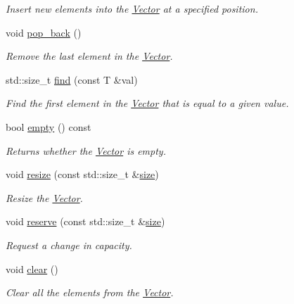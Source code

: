 \begin{DoxyCompactItemize}
\begin{DoxyCompactList}\small\item\em Insert new elements into the \hyperlink{classLuna_1_1Vector}{Vector} at a specified position. \end{DoxyCompactList}\item 
void \hyperlink{classLuna_1_1Vector_afd5c648a6a46b09e75ba94f8e7bc65ba}{pop\+\_\+back} ()
\begin{DoxyCompactList}\small\item\em Remove the last element in the \hyperlink{classLuna_1_1Vector}{Vector}. \end{DoxyCompactList}\item 
std\+::size\+\_\+t \hyperlink{classLuna_1_1Vector_a3400289dadcbd252a7cc5401e81a7dbb}{find} (const T \&val)
\begin{DoxyCompactList}\small\item\em Find the first element in the \hyperlink{classLuna_1_1Vector}{Vector} that is equal to a given value. \end{DoxyCompactList}\item 
bool \hyperlink{classLuna_1_1Vector_afdb918d5b0eb66b94f8f9201b8bb7e45}{empty} () const
\begin{DoxyCompactList}\small\item\em Returns whether the \hyperlink{classLuna_1_1Vector}{Vector} is empty. \end{DoxyCompactList}\item 
void \hyperlink{classLuna_1_1Vector_ae1394f960d5cac3e60f6b1561f38e453}{resize} (const std\+::size\+\_\+t \&\hyperlink{classLuna_1_1Vector_ac9b6ed7a0df401728f27c193fbc8f4d8}{size})
\begin{DoxyCompactList}\small\item\em Resize the \hyperlink{classLuna_1_1Vector}{Vector}. \end{DoxyCompactList}\item 
void \hyperlink{classLuna_1_1Vector_ae0f59108f43c00b44a12aef3c722fb1d}{reserve} (const std\+::size\+\_\+t \&\hyperlink{classLuna_1_1Vector_ac9b6ed7a0df401728f27c193fbc8f4d8}{size})
\begin{DoxyCompactList}\small\item\em Request a change in capacity. \end{DoxyCompactList}\item 
void \hyperlink{classLuna_1_1Vector_a7d2f6fca261feba2660cfb2b4819e5e1}{clear} ()
\begin{DoxyCompactList}\small\item\em Clear all the elements from the \hyperlink{classLuna_1_1Vector}{Vector}. \end{DoxyCompactList}\item 

\end{DoxyCompactItemize}

